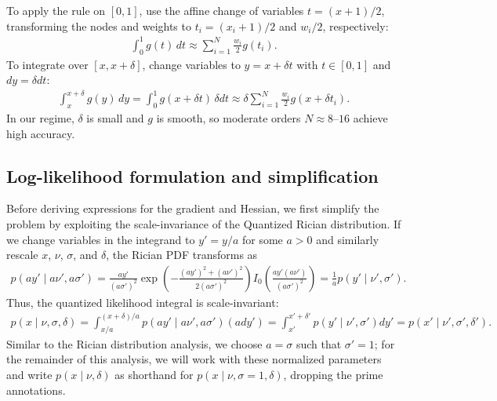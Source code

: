 \documentclass{article}
\begin{document}
To apply the rule on $[0,1]$, use the affine change of variables $t = (x+1)/2$, transforming the nodes and weights to $t_i = (x_i+1)/2$ and $w_i/2$, respectively:
%
\begin{align}
  \int_{0}^{1} g(t) \, dt \approx \sum_{i=1}^{N} \frac{w_i}{2} g(t_i).
\end{align}
%
To integrate over $[x, x+\delta]$, change variables to $y = x + \delta t$ with $t\in[0,1]$ and $dy = \delta dt$:
%
\begin{align}
  \int_{x}^{x+\delta} g(y) \, dy = \int_{0}^{1} g(x + \delta t) \, \delta dt
  \approx \delta \sum_{i=1}^{N} \frac{w_i}{2} g(x + \delta t_i).
\end{align}
%
In our regime, $\delta$ is small and $g$ is smooth, so moderate orders $N \approx 8\text{--}16$ achieve high accuracy.

\subsection{Log-likelihood formulation and simplification}

Before deriving expressions for the gradient and Hessian, we first simplify the problem by exploiting the scale-invariance of the Quantized Rician distribution.
If we change variables in the integrand to $y' = y / a$ for some $a > 0$ and similarly rescale $x$, $\nu$, $\sigma$, and $\delta$, the Rician PDF transforms as
%
\begin{align}
  p(a y' \mid a \nu', a \sigma')
  = \frac{a y'}{(a \sigma')^2} \exp\left(-\frac{(a y')^2+(a \nu')^2}{2(a \sigma')^2}\right) I_0\left(\frac{a y' (a \nu')}{(a \sigma')^2}\right)
  = \frac{1}{a} p(y' \mid \nu', \sigma').
\end{align}
%
Thus, the quantized likelihood integral is scale-invariant:
%
\begin{align}
  p(x \mid \nu, \sigma, \delta)
  = \int_{x/a}^{(x+\delta)/a} p(a y' \mid a\nu', a\sigma') (a dy') = \int_{x'}^{x'+\delta'} p(y' \mid \nu', \sigma') dy'
  = p(x' \mid \nu', \sigma', \delta').
\end{align}
%
Similar to the Rician distribution analysis, we choose $a = \sigma$ such that $\sigma'=1$;
for the remainder of this analysis, we will work with these normalized parameters and write $p(x \mid \nu, \delta)$ as shorthand for $p(x \mid \nu, \sigma=1, \delta)$, dropping the prime annotations.
\end{document}
